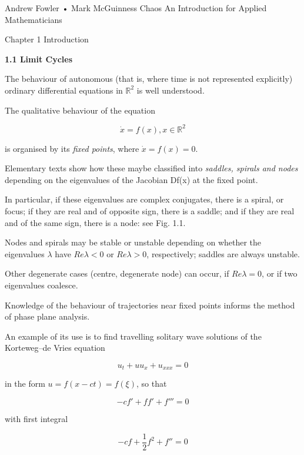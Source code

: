 \documentclass{article}
\begin{document}
Andrew Fowler • Mark McGuinness
Chaos
An Introduction for Applied Mathematicians

\hfill

Chapter 1
Introduction

\hfill

\textbf{1.1 Limit Cycles}


\hfill

The behaviour of autonomous (that is, where time is not represented explicitly)
ordinary differential equations in $\mathbb{R}^2$ is well understood. 

\hfill

The qualitative behaviour
of the equation

\[
\dot{x} = f (x), x \in \mathbb{R}^2
\]

is organised by its \textit{fixed points}, where $\dot{x} = f (x) = 0$. 

\hfill

Elementary texts show how
these maybe classified into \textit{saddles, spirals and nodes} depending on the eigenvalues
of the Jacobian Df(x) at the fixed point. 

\hfill

In particular, if these eigenvalues are complex
conjugates, there is a spiral, or focus; if they are real and of opposite sign, there
is a saddle; and if they are real and of the same sign, there is a node: see Fig. 1.1.

\hfill

Nodes and spirals may be stable or unstable depending on whether the eigenvalues $\lambda$
have $Re \lambda < 0$ or $Re \lambda > 0$, respectively; saddles are always unstable. 

\hfill

Other degenerate
cases (centre, degenerate node) can occur, if $Re \lambda = 0$, or if two eigenvalues
coalesce.

Knowledge of the behaviour of trajectories near fixed points informs the method
of phase plane analysis. 

\hfill

An example of its use is to find travelling solitary wave
solutions of the Korteweg–de Vries equation

\[
u_t + uu_x + u_{xxx} = 0
\]

in the form $u = f (x - ct) = f (\xi)$, so that

\[
- cf' + f f' + f''' = 0
\]

with first integral

\[
- cf + \frac{1}{2} f^2 + f'' =0 
\]
\end{document}
